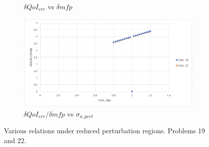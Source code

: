 \documentclass{article}
\begin{document}
\begin{figure}[H]
\begin{subfigure}{.49\textwidth}
  \caption{$\delta QoI_{err}$ vs $\delta mfp$}
  \label{fig:sub3}
\end{subfigure}
\begin{subfigure}{.49\textwidth}
  \centering
  \includegraphics[width=1\linewidth]{dQOIdivMfpVsSiga2.png}
  \caption{$\delta QoI_{err}/\delta mfp$ vs $\sigma_{a,pert}$}
  \label{fig:sub4}
\end{subfigure}
\caption{Various relations under reduced perturbation regions. Problems 19 and 22.}
\label{fig:Comp1}
\end{figure}
\end{document}
